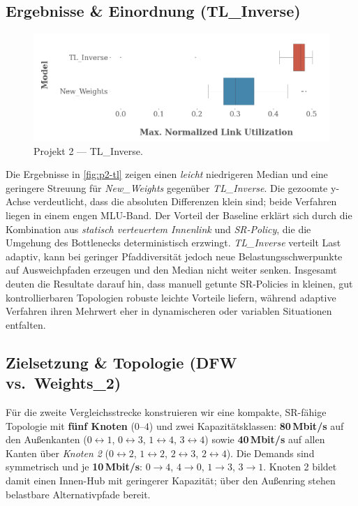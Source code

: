 \documentclass[sigconf,nonacm,review]{acmart}
\begin{document}
\subsection{Ergebnisse \& Einordnung (TL\_Inverse)}
\begin{figure}[H]
  \centering
  \includegraphics[width=.9\linewidth]{TL_New_Weights.png}
  \caption{Projekt 2 — TL\_Inverse.}
  \label{fig:p2-tl}
\end{figure}
\noindent
Die Ergebnisse in \autoref{fig:p2-tl} zeigen einen \emph{leicht} niedrigeren Median und eine geringere Streuung für \textit{New\_Weights} gegenüber \textit{TL\_Inverse}. Die gezoomte y-Achse verdeutlicht, dass die absoluten Differenzen klein sind; beide Verfahren liegen in einem engen MLU-Band. Der Vorteil der Baseline erklärt sich durch die Kombination aus \emph{statisch verteuertem Innenlink} und \emph{SR-Policy}, die die Umgehung des Bottlenecks deterministisch erzwingt. \textit{TL\_Inverse} verteilt Last adaptiv, kann bei geringer Pfaddiversität jedoch neue Belastungsschwerpunkte auf Ausweichpfaden erzeugen und den Median nicht weiter senken. Insgesamt deuten die Resultate darauf hin, dass manuell getunte SR-Policies in kleinen, gut kontrollierbaren Topologien robuste leichte Vorteile liefern, während adaptive Verfahren ihren Mehrwert eher in dynamischeren oder variablen Situationen entfalten.

\subsection{Zielsetzung \& Topologie (DFW vs.\ Weights\_2)}
Für die zweite Vergleichsstrecke konstruieren wir eine kompakte, SR-fähige Topologie mit \textbf{fünf Knoten}
($0$–$4$) und zwei Kapazitätsklassen: \textbf{80\,Mbit/s} auf den Außenkanten ($0\!\leftrightarrow\!1$,
$0\!\leftrightarrow\!3$, $1\!\leftrightarrow\!4$, $3\!\leftrightarrow\!4$) sowie \textbf{40\,Mbit/s} auf
allen Kanten über \emph{Knoten 2} ($0\!\leftrightarrow\!2$, $1\!\leftrightarrow\!2$, $2\!\leftrightarrow\!3$,
$2\!\leftrightarrow\!4$). Die Demands sind symmetrisch und je \textbf{10\,Mbit/s}: $0\!\to\!4$, $4\!\to\!0$,
$1\!\to\!3$, $3\!\to\!1$. Knoten 2 bildet damit einen Innen-Hub mit geringerer Kapazität; über den Außenring
stehen belastbare Alternativpfade bereit.
\end{document}
